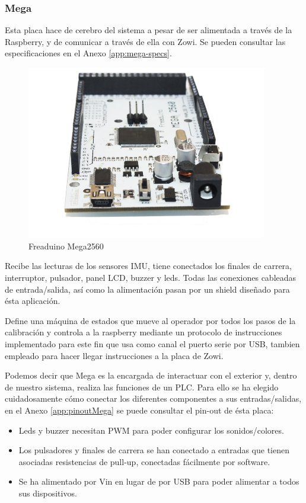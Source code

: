 \subsubsection{Mega}
Esta placa hace de cerebro del sistema a pesar de ser alimentada a través de la Raspberry, y de comunicar a través de ella con Zowi. Se pueden consultar las especificaciones en el Anexo \ref{app:mega-specs}.

\begin{figure}
\centering
\includegraphics[width=105mm]{Figures/arduinoMega}
\caption{Freaduino Mega2560}
\label{fig:arduinoMega}
\end{figure}

Recibe las lecturas de los sensores IMU, tiene conectados los finales de carrera, interruptor, pulsador, panel LCD, buzzer y leds. Todas las conexiones cableadas de entrada/salida, así como la alimentación pasan por un shield diseñado para ésta aplicación.

Define una máquina de estados que mueve al operador por todos los pasos de la calibración y controla a la raspberry mediante un protocolo de instrucciones implementado para este fin que usa como canal el puerto serie por USB, tambien empleado para hacer llegar instrucciones a la placa de Zowi.

Podemos decir que Mega es la encargada de interactuar con el exterior y, dentro de nuestro sistema, realiza las funciones de un PLC. Para ello se ha elegido cuidadosamente cómo conectar los diferentes componentes a sus entradas/salidas, en el Anexo \ref{app:pinoutMega} se puede consultar el pin-out de ésta placa:
\begin{itemize}
  \item Leds y buzzer necesitan PWM para poder configurar los sonidos/colores.
  \item Los pulsadores y finales de carrera se han conectado a entradas que tienen asociadas resistencias de pull-up, conectadas fácilmente por software.
  \item Se ha alimentado por Vin en lugar de por USB para poder alimentar a todos sus dispositivos.
\end{itemize}

